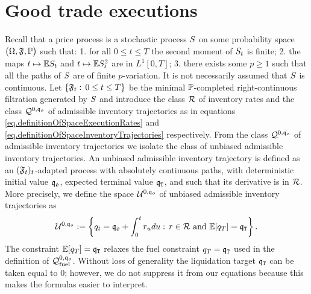\documentclass[10pt,a4paper]{article}
\begin{document}

\section{Good trade executions} \label{sec.goodTradeExecutions}
Recall that a price process is a stochastic process $S$ on some probability space $\big(\Omega,\mathfrak{F}, {\mathbb{P}} \big)$ such that: 1. for all $0\leq t\leq T$ the second moment of $S_t$ is finite; 2. the maps $t\mapsto \mathbb{{E}}S_t$ and $t\mapsto \mathbb{{E}}S^{2}_t$ are in $L^1[0,T]$; 3. there exists some $p\geq 1$ such that all the paths of $S$ are of finite $p$-variation. It is not necessarily assumed that $S$ is continuous. Let $\lbrace \mathfrak{F}_t: \, 0\leq t\leq T \rbrace$ be the minimal ${\mathbb{P}}$-completed right-continuous filtration generated by $S$ and introduce the class $\mathcal{R}$ of inventory rates and the class $\mathcal{Q}^{0,\mathfrak{q_0}}$ of admissible inventory trajectories as in equations \eqref{eq.definitionOfSpaceExecutionRates} and \eqref{eq.definitionOfSpaceInventoryTrajectories} respectively. From the class $\mathcal{Q}^{0,\mathfrak{q_0}}$ of admissible inventory trajectories we isolate the class of unbiased admissible inventory trajectories. 
An unbiased  admissible inventory trajectory is defined as an $(\mathfrak{F}_t)_t$-adapted process with absolutely continuous paths, with deterministic initial value $\mathfrak{q_0}$, expected terminal value $\mathfrak{q}_{\mathtt{T} }$, and such that its derivative is in $\mathcal{R}$.  More precisely, we define the space $\mathcal{U}^{0,\mathfrak{q_0}}$ of unbiased admissible inventory trajectories as 
\begin{equation*}
\mathcal{U}^{0,\mathfrak{q_0}}:= \left\lbrace
q_t=\mathfrak{q_0} + \int_{0}^{t}r_udu: \, r \in \mathcal{R} \text{ and } \mathbb{{E}} [q_T] = \mathfrak{q}_{\mathtt{T} }
\right\rbrace.
\end{equation*}
The constraint $\mathbb{{E}} [q_T] = \mathfrak{q}_{\mathtt{T} }$ relaxes the fuel constraint $ q_T = \mathfrak{q}_{\mathtt{T} }$ used in the definition of $\mathcal{Q}_{\text{fuel}}^{0,\mathfrak{q_0}}$. Without loss of generality the liquidation target $\mathfrak{q}_{\mathtt{T} }$ can be taken equal to $0$; however, we do not suppress it from our equations because this makes the formulas easier to interpret. 
\end{document}
